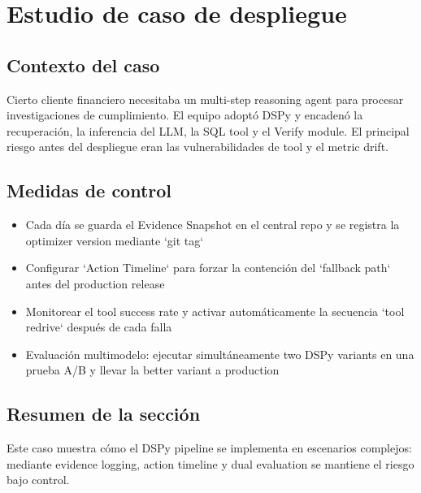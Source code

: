 \section{Estudio de caso de despliegue}

\subsection{Contexto del caso}

Cierto cliente financiero necesitaba un multi-step reasoning agent para procesar investigaciones de cumplimiento. El equipo adoptó DSPy y encadenó la recuperación, la inferencia del LLM, la SQL tool y el Verify module. El principal riesgo antes del despliegue eran las vulnerabilidades de tool y el metric drift.

\subsection{Medidas de control}

\begin{itemize}
    \item Cada día se guarda el Evidence Snapshot en el central repo y se registra la optimizer version mediante `git tag`
    \item Configurar `Action Timeline` para forzar la contención del `fallback path` antes del production release
    \item Monitorear el tool success rate y activar automáticamente la secuencia `tool redrive` después de cada falla
    \item Evaluación multimodelo: ejecutar simultáneamente two DSPy variants en una prueba A/B y llevar la better variant a production
\end{itemize}

\subsection{Resumen de la sección}

Este caso muestra cómo el DSPy pipeline se implementa en escenarios complejos: mediante evidence logging, action timeline y dual evaluation se mantiene el riesgo bajo control.

